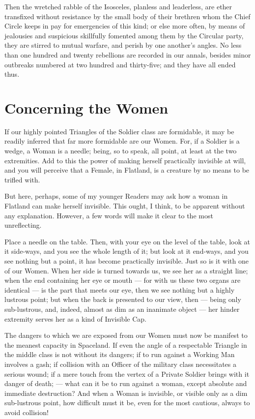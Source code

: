 \documentclass[12pt, a4paper, oneside]{memoir}
\begin{document}
Then the wretched rabble of the Isosceles, planless and leaderless, are ether
transfixed without resistance by the small body of their brethren whom the
Chief Circle keeps in pay for emergencies of this kind; or else more often, by
means of jealousies and suspicious skillfully fomented among them by the
Circular party, they are stirred to mutual warfare, and perish by one
another's angles. No less than one hundred and twenty rebellions are recorded
in our annals, besides minor outbreaks numbered at two hundred and
thirty-five; and they have all ended thus.














\chapter{Concerning the Women}
If our highly pointed Triangles of the Soldier class are formidable, it may be
readily inferred that far more formidable are our Women. For, if a Soldier is
a wedge, a Woman is a needle; being, so to speak, all point, at least at the
two extremities. Add to this the power of making herself practically invisible
at will, and you will perceive that a Female, in Flatland, is a creature by no
means to be trifled with.

But here, perhaps, some of my younger Readers may ask how a woman in Flatland
can make herself invisible. This ought, I think, to be apparent without any
explanation. However, a few words will make it clear to the most unreflecting.

Place a needle on the table. Then, with your eye on the level of the table,
look at it side-ways, and you see the whole length of it; but look at it
end-ways, and you see nothing but a point, it has become practically
invisible. Just so is it with one of our Women. When her side is turned
towards us, we see her as a straight line; when the end containing her eye or
mouth --- for with us these two organs are identical --- is the part that meets
our eye, then we see nothing but a highly lustrous point; but when the back is
presented to our view, then --- being only sub-lustrous, and, indeed, almost as
dim as an inanimate object --- her hinder extremity serves her as a kind of
Invisible Cap.

The dangers to which we are exposed from our Women must now be manifest to the
meanest capacity in Spaceland. If even the angle of a respectable Triangle in
the middle class is not without its dangers; if to run against a Working Man
involves a gash; if collision with an Officer of the military class
necessitates a serious wound; if a mere touch from the vertex of a Private
Soldier brings with it danger of death; --- what can it be to run against a
woman, except absolute and immediate destruction? And when a Woman is
invisible, or visible only as a dim sub-lustrous point, how difficult must it
be, even for the most cautious, always to avoid collision!
\end{document}
